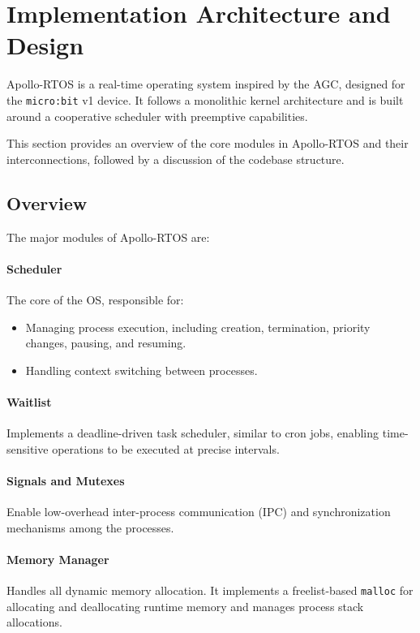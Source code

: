 \section{Implementation Architecture and Design}

Apollo-RTOS is a real-time operating system inspired by the AGC, designed for the
\texttt{micro:bit} v1 device. It follows a monolithic kernel architecture and is built
around a cooperative scheduler with preemptive capabilities. 

This section provides an overview of the core modules in Apollo-RTOS and their
interconnections, followed by a discussion of the codebase structure.

\subsection{Overview}

The major modules of Apollo-RTOS are:

\paragraph*{Scheduler} The core of the OS, responsible for:
\begin{itemize}
    \item Managing process execution, including creation, termination, priority
        changes, pausing, and resuming.
    \item Handling context switching between processes.
\end{itemize}

\paragraph*{Waitlist} Implements a deadline-driven task scheduler, similar to cron
jobs, enabling time-sensitive operations to be executed at precise intervals.

\paragraph*{Signals and Mutexes} Enable low-overhead inter-process communication (IPC)
and synchronization mechanisms among the processes.

\paragraph*{Memory Manager} Handles all dynamic memory allocation. It implements a
freelist-based \texttt{malloc} for allocating and deallocating runtime memory and
manages process stack allocations.

